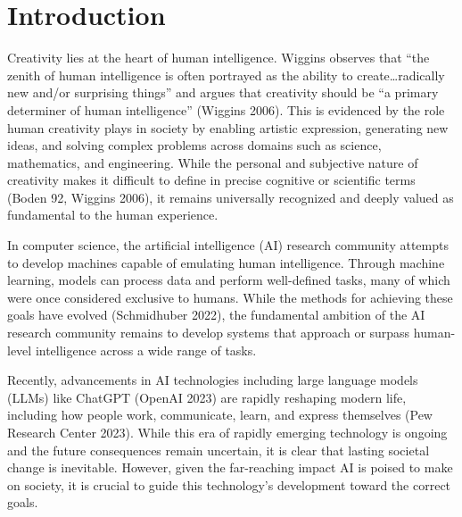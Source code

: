 \documentclass[phd,electronic,oneside,twosidetoc,letterpaper,chaptercenter,parttop,lof]{byumsphd}
\title{\Title}
\author{\Author}
\begin{document}
\maketitle
{}

\chapter{Introduction} 
\label{chap:intro}

Creativity lies at the heart of human intelligence.
Wiggins observes that “the zenith of human intelligence is often portrayed as the ability to create…radically new and/or surprising things” and argues that creativity should be “a primary determiner of human intelligence” (Wiggins 2006).
This is evidenced by the role human creativity plays in society by enabling artistic expression, generating new ideas, and solving complex problems across domains such as science, mathematics, and engineering.
While the personal and subjective nature of creativity makes it difficult to define in precise cognitive or scientific terms (Boden 92, Wiggins 2006), it remains universally recognized and deeply valued as fundamental to the human experience.

In computer science, the artificial intelligence (AI) research community attempts to develop machines capable of emulating human intelligence.
Through machine learning, models can process data and perform well-defined tasks, many of which were once considered exclusive to humans.
While the methods for achieving these goals have evolved (Schmidhuber 2022), the fundamental ambition of the AI research community remains to develop systems that approach or surpass human-level intelligence across a wide range of tasks.

Recently, advancements in AI technologies including large language models (LLMs) like ChatGPT (OpenAI 2023) are rapidly reshaping modern life, including how people work, communicate, learn, and express themselves (Pew Research Center 2023). 
While this era of rapidly emerging technology is ongoing and the future consequences remain uncertain, it is clear that lasting societal change is inevitable.
However, given the far-reaching impact AI is poised to make on society, it is crucial to guide this technology’s development toward the correct goals. 
\end{document}
